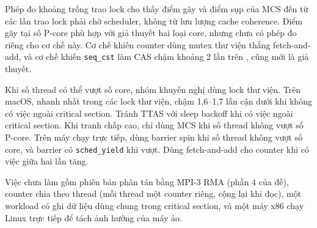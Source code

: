 Phép đo khoảng trống trao lock cho thấy điểm gãy và điểm sụp của MCS đến từ các lần trao lock phải chờ
scheduler, không từ lưu lượng cache coherence. Điểm gãy tại số P-core phù hợp với giả thuyết hai loại
core, nhưng chưa có phép đo riêng cho cơ chế này. Cơ chế khiến counter dùng mutex thư viện thắng
fetch-and-add, và cơ chế khiến \texttt{seq\_cst} làm CAS chậm khoảng 2 lần trên , cũng
mới là giả thuyết.

Khi số thread có thể vượt số core, nhóm khuyến nghị dùng lock thư viện. Trên macOS,
 nhanh nhất trong các lock thư viện, chậm 1,6--1,7 lần cận dưới khi không có
việc ngoài critical section. Tránh TTAS với sleep backoff khi có việc ngoài critical section. Khi tranh
chấp cao, chỉ dùng MCS khi số thread không vượt số P-core. Trên máy chạy trực tiếp, dùng barrier spin
khi số thread không vượt số core, và barrier có \texttt{sched\_yield} khi vượt. Dùng fetch-and-add cho
counter khi có việc giữa hai lần tăng.

Việc chưa làm gồm phiên bản phân tán bằng MPI-3 RMA (phần 4 của đề), counter chia theo thread (mỗi
thread một counter riêng, cộng lại khi đọc), một workload có ghi dữ liệu dùng chung trong critical
section, và một máy x86 chạy Linux trực tiếp để tách ảnh hưởng của máy ảo.

